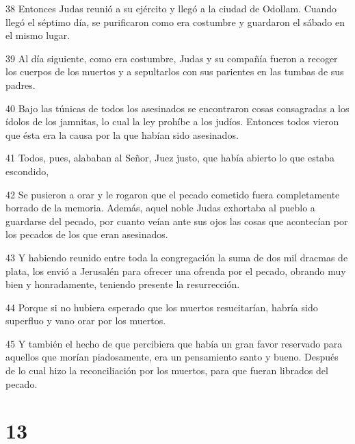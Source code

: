 \par 38 Entonces Judas reunió a su ejército y llegó a la ciudad de Odollam. Cuando llegó el séptimo día, se purificaron como era costumbre y guardaron el sábado en el mismo lugar.
\par 39 Al día siguiente, como era costumbre, Judas y su compañía fueron a recoger los cuerpos de los muertos y a sepultarlos con sus parientes en las tumbas de sus padres.
\par 40 Bajo las túnicas de todos los asesinados se encontraron cosas consagradas a los ídolos de los jamnitas, lo cual la ley prohíbe a los judíos. Entonces todos vieron que ésta era la causa por la que habían sido asesinados.
\par 41 Todos, pues, alababan al Señor, Juez justo, que había abierto lo que estaba escondido,
\par 42 Se pusieron a orar y le rogaron que el pecado cometido fuera completamente borrado de la memoria. Además, aquel noble Judas exhortaba al pueblo a guardarse del pecado, por cuanto veían ante sus ojos las cosas que acontecían por los pecados de los que eran asesinados.
\par 43 Y habiendo reunido entre toda la congregación la suma de dos mil dracmas de plata, los envió a Jerusalén para ofrecer una ofrenda por el pecado, obrando muy bien y honradamente, teniendo presente la resurrección.
\par 44 Porque si no hubiera esperado que los muertos resucitarían, habría sido superfluo y vano orar por los muertos.
\par 45 Y también el hecho de que percibiera que había un gran favor reservado para aquellos que morían piadosamente, era un pensamiento santo y bueno. Después de lo cual hizo la reconciliación por los muertos, para que fueran librados del pecado.

\chapter{13}

